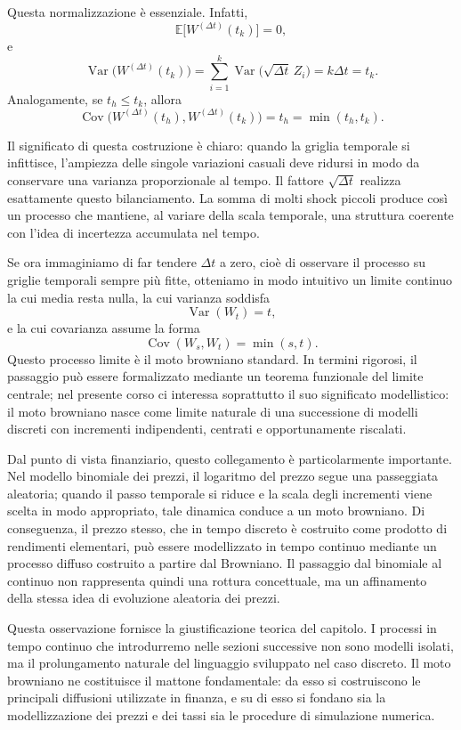 Questa normalizzazione \`e essenziale. Infatti,
\[
\mathbb{E}\bigl[W^{(\Delta t)}(t_k)\bigr]=0,
\]
e
\[
\operatorname{Var}\bigl(W^{(\Delta t)}(t_k)\bigr)
=
\sum_{i=1}^{k}\operatorname{Var}\bigl(\sqrt{\Delta t}\,Z_i\bigr)
=
k\Delta t
=
t_k.
\]
Analogamente, se $t_h\leq t_k$, allora
\[
\operatorname{Cov}\bigl(W^{(\Delta t)}(t_h),W^{(\Delta t)}(t_k)\bigr)
=
t_h
=
\min(t_h,t_k).
\]

Il significato di questa costruzione \`e chiaro: quando la griglia
temporale si infittisce, l'ampiezza delle singole variazioni casuali
deve ridursi in modo da conservare una varianza proporzionale al tempo.
Il fattore $\sqrt{\Delta t}$ realizza esattamente questo bilanciamento.
La somma di molti shock piccoli produce cos\`i un processo che mantiene,
al variare della scala temporale, una struttura coerente con l'idea di
incertezza accumulata nel tempo.

Se ora immaginiamo di far tendere $\Delta t$ a zero, cio\`e di osservare
il processo su griglie temporali sempre pi\`u fitte, otteniamo in modo
intuitivo un limite continuo la cui media resta nulla, la cui varianza
soddisfa
\[
\operatorname{Var}(W_t)=t,
\]
e la cui covarianza assume la forma
\[
\operatorname{Cov}(W_s,W_t)=\min(s,t).
\]
Questo processo limite \`e il moto browniano standard. In termini
rigorosi, il passaggio pu\`o essere formalizzato mediante un teorema
funzionale del limite centrale; nel presente corso ci interessa
soprattutto il suo significato modellistico: il moto browniano nasce
come limite naturale di una successione di modelli discreti con
incrementi indipendenti, centrati e opportunamente riscalati.

Dal punto di vista finanziario, questo collegamento \`e particolarmente
importante. Nel modello binomiale dei prezzi, il logaritmo del prezzo
segue una passeggiata aleatoria; quando il passo temporale si riduce e
la scala degli incrementi viene scelta in modo appropriato, tale
dinamica conduce a un moto browniano. Di conseguenza, il prezzo stesso,
che in tempo discreto \`e costruito come prodotto di rendimenti
elementari, pu\`o essere modellizzato in tempo continuo mediante un
processo diffuso costruito a partire dal Browniano. Il passaggio dal
binomiale al continuo non rappresenta quindi una rottura concettuale, ma
un affinamento della stessa idea di evoluzione aleatoria dei prezzi.

Questa osservazione fornisce la giustificazione teorica del capitolo. I
processi in tempo continuo che introdurremo nelle sezioni successive non
sono modelli isolati, ma il prolungamento naturale del linguaggio
sviluppato nel caso discreto. Il moto browniano ne costituisce il
mattone fondamentale: da esso si costruiscono le principali diffusioni
utilizzate in finanza, e su di esso si fondano sia la modellizzazione
dei prezzi e dei tassi sia le procedure di simulazione numerica.


